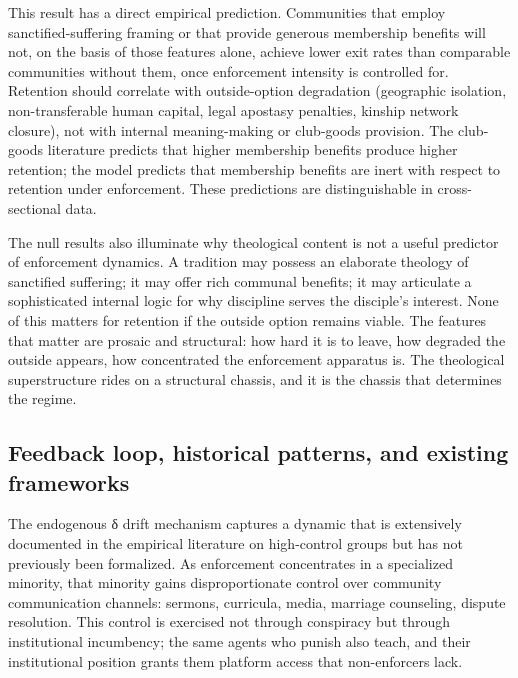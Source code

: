 \documentclass[12pt]{article}
\begin{document}
This result has a direct empirical prediction. Communities that employ sanctified-suffering framing or that provide generous membership benefits will not, on the basis of those features alone, achieve lower exit rates than comparable communities without them, once enforcement intensity is controlled for. Retention should correlate with outside-option degradation (geographic isolation, non-transferable human capital, legal apostasy penalties, kinship network closure), not with internal meaning-making or club-goods provision. The club-goods literature predicts that higher membership benefits produce higher retention; the model predicts that membership benefits are inert with respect to retention under enforcement. These predictions are distinguishable in cross-sectional data.

The null results also illuminate why theological content is not a useful predictor of enforcement dynamics. A tradition may possess an elaborate theology of sanctified suffering; it may offer rich communal benefits; it may articulate a sophisticated internal logic for why discipline serves the disciple's interest. None of this matters for retention if the outside option remains viable. The features that matter are prosaic and structural: how hard it is to leave, how degraded the outside appears, how concentrated the enforcement apparatus is. The theological superstructure rides on a structural chassis, and it is the chassis that determines the regime.

%
\subsection{Feedback loop, historical patterns, and existing frameworks}

The endogenous δ drift mechanism captures a dynamic that is extensively documented in the empirical literature on high-control groups but has not previously been formalized. As enforcement concentrates in a specialized minority, that minority gains disproportionate control over community communication channels: sermons, curricula, media, marriage counseling, dispute resolution. This control is exercised not through conspiracy but through institutional incumbency; the same agents who punish also teach, and their institutional position grants them platform access that non-enforcers lack.
\end{document}
